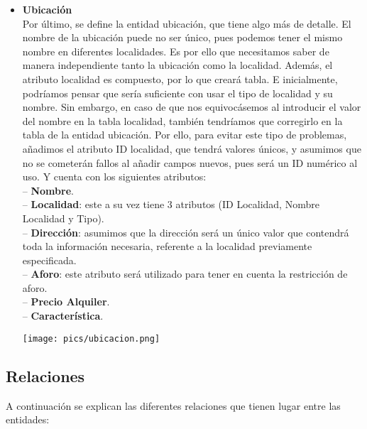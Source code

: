 \documentclass[12pt]{article}
\begin{document}
\begin{itemize}
        \item \textbf{Ubicación}\\
            Por último, se define la entidad ubicación, que tiene algo más de detalle. El nombre de la ubicación puede no ser único, pues podemos tener el mismo
            nombre en diferentes localidades. Es por ello que necesitamos saber de manera independiente tanto la ubicación como la localidad.
            Además, el atributo localidad es compuesto, por lo que creará tabla. E inicialmente, podríamos pensar que sería suficiente con usar el tipo de localidad 
            y su nombre. Sin embargo, en caso de que nos equivocásemos al introducir el valor del nombre en la tabla localidad, también tendríamos que corregirlo
            en la tabla de la entidad ubicación. Por ello, para evitar este tipo de problemas, añadimos el atributo ID localidad, que tendrá valores únicos, 
            y asumimos que no se cometerán fallos al añadir campos nuevos, pues será un ID numérico al uso. 
            Y cuenta con los siguientes atributos: \\
                \hspace{0.5cm} -- {\bfseries Nombre}. \\
                \hspace{0.5cm} -- {\bfseries Localidad}: este a su vez tiene 3 atributos (ID Localidad, Nombre Localidad y Tipo). \\
                \hspace{0.5cm} -- {\bfseries Dirección}: asumimos que la dirección será un único valor que contendrá toda la información necesaria,
                referente a la localidad previamente especificada. \\
                \hspace{0.5cm} -- {\bfseries Aforo}: este atributo será utilizado para tener en cuenta la restricción de aforo. \\
                \hspace{0.5cm} -- {\bfseries Precio Alquiler}. \\
                \hspace{0.5cm} -- {\bfseries Característica}.
            \begin{center}
            {\texttt{[image: pics/ubicacion.png]}}
            \end{center}

    
    \end{itemize}

    \newpage
    \subsection{Relaciones}
    A continuación se explican las diferentes relaciones que tienen lugar entre las entidades:
\end{document}
